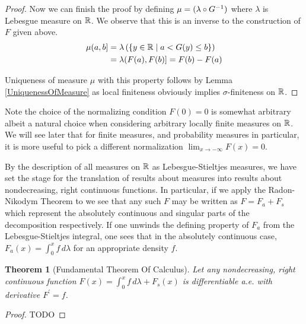 \documentclass{amsart}
\newtheorem{thm}{Theorem}[section]
\theoremstyle{remark}
\theoremstyle{definition}
\begin{document}
\begin{proof}
Now we can finish the proof by 
defining $\mu = (\lambda \circ G^{-1})$ where $\lambda$ is Lebesgue
measure on $\mathbb{R}$.  We observe that this is an inverse to the
construction of $F$ given above.  
\begin{align*}
\mu (a,b] &= \lambda \left ( \lbrace y \in \mathbb{R} \mid a < G(y)  \leq b
  \rbrace \right ) \\
&= \lambda (F(a), F(b)] = F(b) - F(a)
\end{align*}

Uniqueness of measure $\mu$ with this property follows by Lemma
\ref{UniquenessOfMeasure} as local finiteness obviously implies
$\sigma$-finiteness on $\mathbb{R}$.
\end{proof}

Note the choice of the normalizing condition $F(0) = 0$ is somewhat
arbitrary albeit a natural choice when considering arbitrary locally
finite measures on $\mathbb{R}$.  We will see later that for finite
measures, and probability
measures in particular, it is more useful to pick a different
normalization $\lim_{x \to -\infty} F(x) = 0$.

By the description of all measures on $\mathbb{R}$ as
Lebesgue-Stieltjes measures, we have set the stage for the
translation of results about measures into results about
nondecreasing, right continuous functions.  In particular, if we apply
the Radon-Nikodym Theorem to we see that any such $F$ may be written
as $F = F_a + F_s$ which represent the absolutely continuous and
singular parts of the decomposition respectively.  If one unwinds the
defining property of $F_a$ from the Lebesgue-Stieltjes integral, one
sees
 that in the absolutely continuous case, $F_a(x) = \int_0^x f \,
 d\lambda$ for an appropriate density $f$.

\begin{thm}[Fundamental Theorem Of Calculus]\label{FundamentalTheoremOfCalculus}Let any nondecreasing, right continuous function $F(x) = \int_0^x
  f \, d\lambda + F_s(x)$ is differentiable a.e. with derivative $F^\prime = f$.
\end{thm}
\begin{proof}
TODO
\end{proof}
\end{document}
